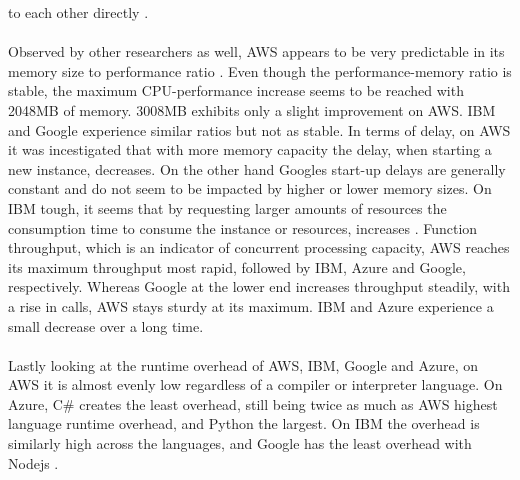 \documentclass[11pt]{article}
\begin{document}
to each other directly \cite{manner2018cold}.\\\\ Observed by other researchers as well, AWS appears to be very predictable in its memory size to performance ratio \cite{pawlik2019performance}. Even though the performance-memory ratio is stable, the maximum CPU-performance increase seems to be reached with 2048MB of memory. 3008MB exhibits only a slight improvement on AWS. IBM and Google experience similar ratios but not as stable. In terms of delay, on AWS it was incestigated that with more memory capacity the delay, when starting a new instance, decreases. On the other hand Googles start-up delays are generally constant and do not seem to be impacted by higher or lower memory sizes. On IBM tough, it seems that by requesting larger amounts of resources the consumption time to consume the instance or resources, increases \cite{pawlik2019performance}. Function throughput, which is an indicator of concurrent processing capacity, AWS reaches its maximum throughput most rapid, followed by IBM, Azure and Google, respectively. Whereas Google at the lower end increases throughput steadily, with a rise in calls, AWS stays sturdy at its maximum. IBM and Azure experience a small decrease over a long time.\\\\ Lastly looking at the runtime overhead of AWS, IBM, Google and Azure, on AWS it is almost evenly low regardless of a compiler or interpreter language. On Azure, C\# creates the least overhead, still being twice as much as AWS highest language runtime overhead, and Python the largest. On IBM the overhead is similarly high across the languages, and Google has the least overhead with Nodejs \cite{pawlik2019performance}.\\\\ 
\end{document}
